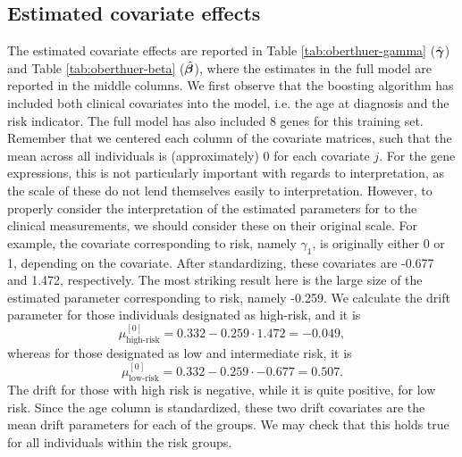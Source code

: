 \subsection{Estimated covariate effects}
The estimated covariate effects are reported in Table \ref{tab:oberthuer-gamma} ($\hat{\boldsymbol{\gamma}}$) and Table \ref{tab:oberthuer-beta} ($\hat{\boldsymbol{\beta}}$), where the estimates in the full model are reported in the middle columns.
We first observe that the boosting algorithm has included both clinical covariates into the model, i.e. the age at diagnosis and the risk indicator.
The full model has also included 8 genes for this training set.
Remember that we centered each column of the covariate matrices, such that the mean across all individuals is (approximately) 0 for each covariate $j$.
For the gene expressions, this is not particularly important with regards to interpretation, as the scale of these do not lend themselves easily to interpretation.
However, to properly consider the interpretation of the estimated parameters for to the clinical measurements, we should consider these on their original scale.
For example, the covariate corresponding to risk, namely $\gamma_1$, is originally either 0 or 1, depending on the covariate.
After standardizing, these covariates are -0.677 and 1.472, respectively.
The most striking result here is the large size of the estimated parameter corresponding to risk, namely -0.259.
We calculate the drift parameter for those individuals designated as high-risk, and it is
\begin{equation*}
    \mu^{[0]}_{\text{high-risk}}=0.332-0.259\cdot1.472=-0.049,
\end{equation*}
whereas for those designated as low and intermediate risk, it is
\begin{equation*}
    \mu^{[0]}_{\text{low-risk}}=0.332-0.259\cdot-0.677=0.507.
\end{equation*}
The drift for those with high risk is negative, while it is quite positive, for low risk.
Since the age column is standardized, these two drift covariates are the mean drift parameters for each of the groups.
We may check that this holds true for all individuals within the risk groups.
